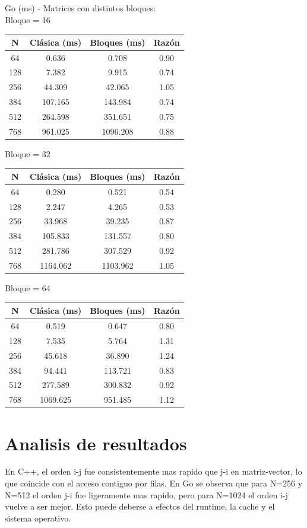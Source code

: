 \documentclass[11pt]{article}
\begin{document}
Go (ms) - Matrices con distintos bloques: \\
Bloque = 16
\begin{center}
\begin{tabular}{|c|c|c|c|}
\hline
N & Clásica (ms) & Bloques (ms) & Razón \\
\hline
64 & 0.636 & 0.708 & 0.90 \\
128 & 7.382 & 9.915 & 0.74 \\
256 & 44.309 & 42.065 & 1.05 \\
384 & 107.165 & 143.984 & 0.74 \\
512 & 264.598 & 351.651 & 0.75 \\
768 & 961.025 & 1096.208 & 0.88 \\
\hline
\end{tabular}
\end{center}

Bloque = 32
\begin{center}
\begin{tabular}{|c|c|c|c|}
\hline
N & Clásica (ms) & Bloques (ms) & Razón \\
\hline
64 & 0.280 & 0.521 & 0.54 \\
128 & 2.247 & 4.265 & 0.53 \\
256 & 33.968 & 39.235 & 0.87 \\
384 & 105.833 & 131.557 & 0.80 \\
512 & 281.786 & 307.529 & 0.92 \\
768 & 1164.062 & 1103.962 & 1.05 \\
\hline
\end{tabular}
\end{center}

Bloque = 64
\begin{center}
\begin{tabular}{|c|c|c|c|}
\hline
N & Clásica (ms) & Bloques (ms) & Razón \\
\hline
64 & 0.519 & 0.647 & 0.80 \\
128 & 7.535 & 5.764 & 1.31 \\
256 & 45.618 & 36.890 & 1.24 \\
384 & 94.441 & 113.721 & 0.83 \\
512 & 277.589 & 300.832 & 0.92 \\
768 & 1069.625 & 951.485 & 1.12 \\
\hline
\end{tabular}
\end{center}

\section*{Analisis de resultados}
En C++, el orden i-j fue consistentemente mas rapido que j-i en matriz-vector, lo que coincide con el acceso contiguo por filas. En Go se observa que para N=256 y N=512 el orden j-i fue ligeramente mas rapido, pero para N=1024 el orden i-j vuelve a ser mejor. Esto puede deberse a efectos del runtime, la cache y el sistema operativo.
\end{document}
